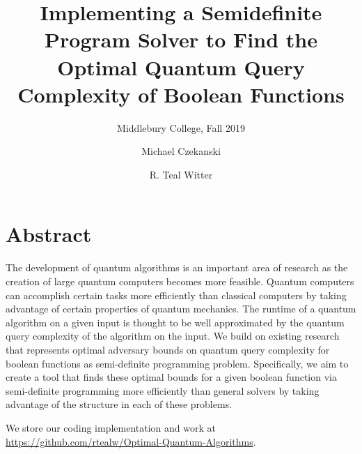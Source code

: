 \documentclass[acmtog]{acmart}
\begin{document}
\title{Implementing a Semidefinite Program Solver to 
Find the Optimal Quantum Query Complexity
of Boolean Functions}

\subtitle{Middlebury College, Fall 2019}

\author{Michael Czekanski}

\author{R. Teal Witter}

\maketitle

\section*{Abstract}

The development of quantum algorithms is an important area
of research as the creation of large quantum computers
becomes more feasible. Quantum computers can accomplish
certain tasks more efficiently than classical computers by
taking advantage of certain properties of quantum mechanics.
The runtime of a quantum algorithm on a given input is
thought to be well approximated by the quantum query
complexity of the algorithm on the input. We build on
existing research that represents optimal adversary bounds
on quantum query complexity for boolean functions as
semi-definite programming problem. Specifically, we aim to
create a tool that finds these optimal bounds for a given
boolean function via semi-definite programming more
efficiently than general solvers by taking advantage of the
structure in each of these problems.

We store our coding implementation and work at
\url{https://github.com/rtealw/Optimal-Quantum-Algorithms}.










\end{document}
